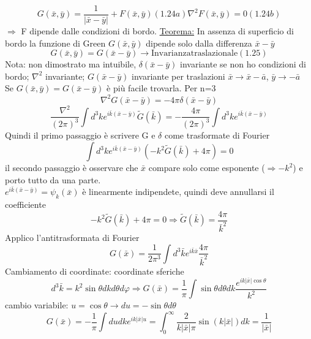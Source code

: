 \documentclass[a4paper,11pt]{report}
\newcommand{\x}{\bar{x}}
\newcommand{\y}{\bar{y}}
\newcommand{\kk}{\bar{k}}
\begin{document}
\begin{subequations}
\begin{equation}
G(\x,\y)=\dfrac{1}{|\x-\y|}+F(\x,\y) (1.24a)
\end{equation}
\begin{equation}
\nabla^2F(\x,\y)=0 (1.24b)
\end{equation}
\end{subequations}
$\Rightarrow$ F dipende dalle condizioni di bordo.
\underline{Teorema:} In assenza di superficio di bordo la funzione di Green $G(\x,\y)$ dipende solo dalla differenza $\x-\y$
$$
G(\x,\y)=G(\x-\y)\rightarrow\mathrm{Invarianza traslazionale} (1.25)
$$
Nota: non dimostrato ma intuibile, $\delta(\x-\y)$ invariante se non ho condizioni di bordo; $\nabla^2$ invariante; $G(\x-\y)$ invariante per traslazioni $\x\rightarrow\x-\bar{a}$, $\y\rightarrow-\bar{a}$\\
Se $G(\x,\y)=G(\x-\y)$ è più facile trovarla. Per n=3
$$
\nabla^2G(\x-\y)=-4\pi\delta(\x-\y)
$$
$$
\dfrac{\nabla^2}{(2\pi)^3}\int d^3k e^{i\kk(\x-\y)}\tilde{G}(\kk)=-\dfrac{4\pi}{(2\pi)^3}\int d^3ke^{i\kk(\x-\y)}
$$
Quindi il primo passaggio è scrivere G e $\delta$ come trasformate di Fourier
$$
\int d^3ke^{i\kk(\x-\y)}(-k^2\tilde{G}(\kk)+4\pi)=0
$$
il secondo passaggio è osservare che $\x$ compare solo come esponente ($\Rightarrow -k^2$) e porto tutto da una parte.\\
$e^{i\kk(\x-\y)}=\psi_k(\x)$ è linearmente indipendete, quindi deve annullarsi il coefficiente
$$
-k^2\tilde{G}(\kk)+4\pi =0 \Rightarrow \tilde{G}(\kk)=\dfrac{4\pi}{\kk^2}
$$
Applico l'antitrasformata di Fourier
$$
G(\x)=\dfrac{1}{2\pi^3}\int d^3\kk e^{i\kk\x}\dfrac{4\pi}{\kk^2}
$$
Cambiamento di coordinate: coordinate sferiche
$$
d^3\kk=k^2\sin\theta dkd\theta d\varphi \Rightarrow G(\x)=\dfrac{1}{\pi}\int\sin\theta d\theta dk \dfrac{e^{ik|\x|\cos\theta}}{k^2}
$$
cambio variabile: $u=\cos\theta \rightarrow du=-\sin\theta d\theta$
$$
G(\x)=-\dfrac{1}{\pi}\int dudke^{ik|\x|u}=\int_0^{\infty}\dfrac{2}{k|\x|\pi}\sin(k|\x|)dk= \dfrac{1}{|\x|}
$$
\end{document}
